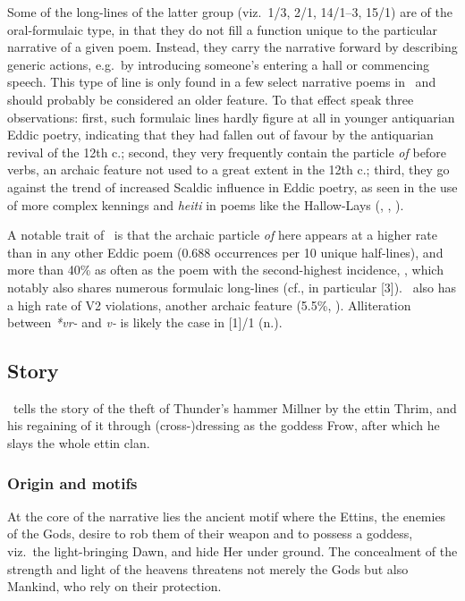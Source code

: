 Some of the long-lines of the latter group (viz.~1/3, 2/1, 14/1--3, 15/1) are of the oral-formulaic type, in that they do not fill a function unique to the particular narrative of a given poem.  Instead, they carry the narrative forward by describing generic actions, e.g.~by introducing someone’s entering a hall or commencing speech.  This type of line is only found in a few select narrative poems in \Fornyrdislag\ and should probably be considered an older feature.  To that effect speak three observations: first, such formulaic lines hardly figure at all in younger antiquarian Eddic poetry, indicating that they had fallen out of favour by the antiquarian revival of the 12th c.; second, they very frequently contain the particle \emph{of} before verbs, an archaic feature not used to a great extent in the 12th c.; third, they go against the trend of increased Scaldic influence in Eddic poetry, as seen in the use of more complex kennings and \emph{heiti} in poems like the Hallow-Lays (, , ).

A notable trait of \Thrymskvida\ is that the archaic particle \emph{of} here appears at a higher rate than in any other Eddic poem (0.688 occurrences per 10 unique half-lines), and more than 40\% as often as the poem with the second-highest incidence,  \parencite[70]{Sapp2022}, which notably also shares numerous formulaic long-lines (cf., in particular [3]).  \Thrymskvida\ also has a high rate of V2 violations, another archaic feature (5.5\%, \cite[254--255]{Haukur2012}).
Alliteration between \emph{*vr-} and \emph{v-} is likely the case in [1]/1 (n.).

\subsection{Story}

\Thrymskvida\ tells the story of the theft of Thunder’s hammer Millner by the ettin Thrim, and his regaining of it through (cross-)dressing as the goddess Frow, after which he slays the whole ettin clan.

\subsubsection{Origin and motifs}

At the core of the narrative lies the ancient motif where the Ettins, the enemies of the Gods, desire to rob them of their weapon and to possess a goddess, viz.~the light-bringing Dawn, and hide Her under ground.  The concealment of the strength and light of the heavens threatens not merely the Gods but also Mankind, who rely on their protection.

